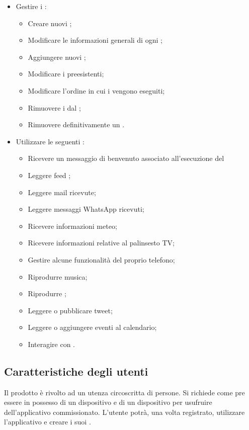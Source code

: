 \begin{itemize}
	\item Gestire i :
	\begin{itemize}
		\item Creare nuovi ;
		\item Modificare le informazioni generali di ogni ;
		\item Aggiungere nuovi ;
		\item Modificare i  preesistenti;
		\item Modificare l'ordine in cui i  vengono eseguiti;
		\item Rimuovere i  dal ;
		\item Rimuovere definitivamente un .
	\end{itemize}
	\item Utilizzare le seguenti :
	\begin{itemize}
		\item Ricevere un messaggio di benvenuto associato all'esecuzione del 
		\item Leggere feed ;
		\item Leggere mail ricevute;
		\item Leggere messaggi WhatsApp ricevuti;
		\item Ricevere informazioni meteo;
		\item Ricevere informazioni relative al palinsesto TV;
		\item Gestire alcune funzionalità del proprio telefono;
		\item Riprodurre musica;
		\item Riprodurre ;
		\item Leggere o pubblicare tweet;
		\item Leggere o aggiungere eventi al calendario;
		\item Interagire con .
	\end{itemize}
\end{itemize}
\subsection{Caratteristiche degli utenti}
Il prodotto è rivolto ad un utenza circoscritta di persone. Si richiede come pre essere in possesso di un dispositivo  e di un dispositivo   per usufruire dell'applicativo commissionato. L'utente potrà, una volta registrato, utilizzare l'applicativo e creare i suoi .
